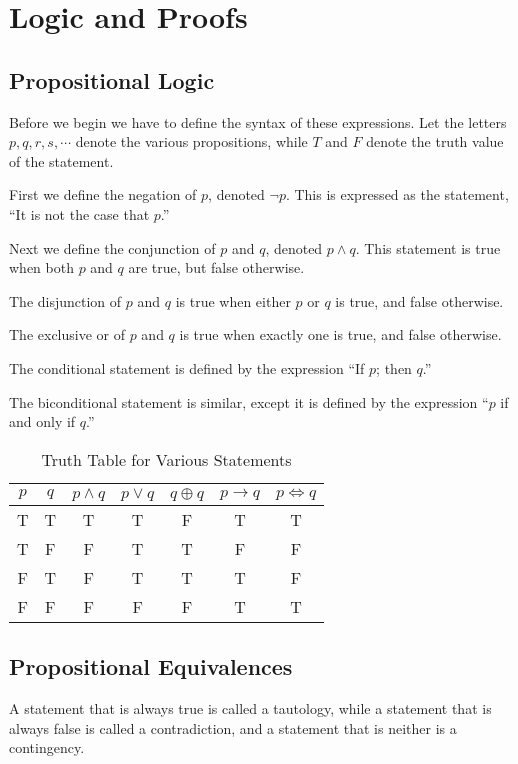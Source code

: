 \section{Logic and Proofs}
    \subsection{Propositional Logic}
    Before we begin we have to define the syntax of these expressions. Let the letters $p, q, r, s, \cdots$ denote the various propositions, while $T$ and $F$ denote the truth value of the statement.

    First we define the negation of $p$, denoted $\neg p$. This is expressed as the statement, ``It is not the case that $p$.''

    Next we define the conjunction of $p$ and $q$, denoted $p \land q$. This statement is true when both $p$ and $q$ are true, but false otherwise.

    The disjunction of $p$ and $q$ is true when either $p$ or $q$ is true, and false otherwise.

    The exclusive or of $p$ and $q$ is true when exactly one is true, and false otherwise.

    The conditional statement is defined by the expression ``If $p$; then $q$.''

    The biconditional statement is similar, except it is defined by the expression ``$p$ if and only if $q$.''

        \begin{table}[ht]
            \centering
            \begin{tabular}{| c | c || c | c | c | c | c |}
                \hline
                $p$ & $q$ & $p \land q$ & $p \lor q$ & $q \oplus q$ & $p \to q$ & $p \iff q$\\
                \hline
                T & T & T & T & F & T & T\\
                T & F & F & T & T & F & F\\
                F & T & F & T & T & T & F\\
                F & F & F & F & F & T & T\\
                \hline
            \end{tabular}
            \label{table:and}
            \caption{Truth Table for Various Statements}
        \end{table}

    \subsection{Propositional Equivalences}
    A statement that is always true is called a tautology, while a statement that is always false is called a contradiction, and a statement that is neither is a contingency.

